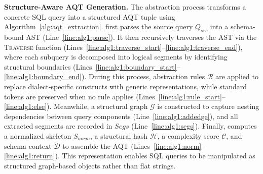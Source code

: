\documentclass[sigconf,review,anonymous]{acmart}
\begin{document}
\textbf{Structure-Aware AQT Generation.} 
The abstraction process transforms a concrete SQL query into a structured AQT tuple using Algorithm~\ref{alg:aqt_extraction}. 
\tool{} first parses the source query $Q_{src}$ into a schema-bound AST (Line~\ref{line:alg1:parse}).
It then recursively traverses the AST via the \textsc{Traverse} function (Lines~\ref{line:alg1:traverse_start}--\ref{line:alg1:traverse_end}), where each subquery is decomposed into logical segments by identifying structural boundaries (Lines~\ref{line:alg1:boundary_start}--\ref{line:alg1:boundary_end}).
During this process, abstraction rules $\mathcal{R}$ are applied to replace dialect-specific constructs with generic representations, while standard tokens are preserved when no rule applies (Lines~\ref{line:alg1:rule_start}--\ref{line:alg1:else}).
Meanwhile, a structural graph $\mathcal{G}$ is constructed to capture nesting dependencies between query components (Line~\ref{line:alg1:addedge}), and all extracted segments are recorded in $Segs$ (Line~\ref{line:alg1:segs}). Finally, \tool{} computes a normalized skeleton $S_{norm}$, a structural hash $\mathcal{H}$, a complexity score $\mathcal{C}$, and schema context $\mathcal{D}$ to assemble the AQT (Lines~\ref{line:alg1:norm}--\ref{line:alg1:return}). This representation enables SQL queries to be manipulated as structured graph-based objects rather than flat strings.
\end{document}
